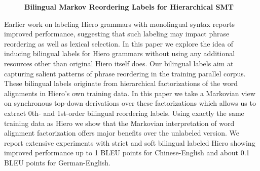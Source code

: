\documentclass[10pt, a4paper, twopage, headinclude, footinclude, BCOR5mm]{book}
\begin{document}
\newpage

\begin{figure}[t!]
\centering
\large\textbf{Bilingual Markov Reordering Labels for Hierarchical SMT}
\vspace*{0.5cm}
\end{figure}


\begin{table}[t!]
\end{table} 
\noindent
Earlier work on labeling Hiero grammars with monolingual syntax reports improved performance, suggesting that such labeling may impact phrase reordering as well  as lexical selection. In this paper we explore the idea of inducing bilingual labels for Hiero grammars without using any additional resources other than original Hiero itself does. Our bilingual labels aim at capturing salient patterns of phrase reordering in the training parallel corpus. These bilingual labels originate from hierarchical factorizations of the word alignments in Hiero’s own training data. In this paper we take a Markovian view on synchronous top-down derivations over these factorizations which allows us to extract 0th- and 1st-order bilingual reordering labels.  Using exactly the same training data as Hiero we show that the Markovian interpretation of word alignment factorization offers major benefits over the unlabeled version. We report extensive experiments with strict and soft bilingual labeled Hiero showing improved performance up to 1 BLEU points for Chinese-English  and about 0.1 BLEU points for German-English.  

\newpage
\end{document}
